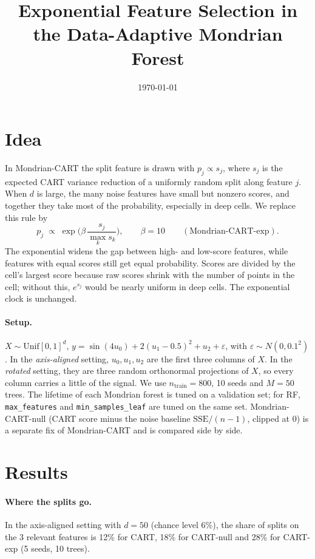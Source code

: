 \documentclass[11pt]{article}
\title{Exponential Feature Selection in the Data-Adaptive Mondrian Forest}
\date{\today}
\begin{document}
\maketitle

\section{Idea}

In Mondrian-CART the split feature is drawn with $p_j \propto s_j$, where $s_j$ is the expected CART
variance reduction of a uniformly random split along feature $j$. When $d$ is large, the many noise
features have small but nonzero scores, and together they take most of the probability, especially
in deep cells. We replace this rule by
\[
  p_j \;\propto\; \exp\!\Big(\beta\,\frac{s_j}{\max_k s_k}\Big), \qquad \beta = 10
  \qquad (\text{Mondrian-CART-exp}).
\]
The exponential widens the gap between high- and low-score features, while features with equal scores
still get equal probability. Scores are divided by the cell's largest score because raw scores shrink
with the number of points in the cell; without this, $e^{s_j}$ would be nearly uniform in deep cells.
The exponential clock is unchanged.

\paragraph{Setup.} $X \sim \mathrm{Unif}[0,1]^d$,
$y = \sin(4u_0) + 2(u_1 - 0.5)^2 + u_2 + \varepsilon$, with $\varepsilon \sim N(0, 0.1^2)$. In the
\emph{axis-aligned} setting, $u_0, u_1, u_2$ are the first three columns of $X$. In the \emph{rotated}
setting, they are three random orthonormal projections of $X$, so every column carries a little of the
signal. We use $n_{\text{train}} = 800$, 10 seeds and $M = 50$ trees. The lifetime of each Mondrian
forest is tuned on a validation set; for RF, \texttt{max\_features} and \texttt{min\_samples\_leaf} are
tuned on the same set. Mondrian-CART-null (CART score minus the noise baseline
$\mathrm{SSE}/(n-1)$, clipped at 0) is a separate fix of Mondrian-CART and is compared side by side.

\section{Results}

\paragraph{Where the splits go.} In the axis-aligned setting with $d = 50$ (chance level 6\%), the share
of splits on the 3 relevant features is 12\% for CART, 18\% for CART-null and 28\% for CART-exp
(5 seeds, 10 trees).
\end{document}
